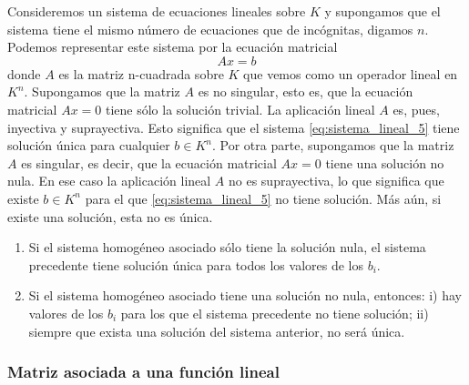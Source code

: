 Consideremos un sistema de ecuaciones lineales sobre \(K\) y supongamos que el sistema tiene el mismo número de ecuaciones que de incógnitas, digamos \(n\). Podemos representar este sistema por la ecuación matricial
\begin{equation}
  Ax = b
  \label{eq:sistema_lineal_5}  
\end{equation}
donde \(A\) es la matriz n-cuadrada sobre \(K\) que vemos como un operador lineal en \(K^n\). Supongamos que la matriz \(A\) es no singular, esto es, que la ecuación matricial \(Ax = 0\) tiene sólo la solución trivial. La aplicación lineal \(A\) es, pues, inyectiva y suprayectiva. Esto significa que el sistema \ref{eq:sistema_lineal_5} tiene solución única para cualquier \(b \in K^n\). Por otra parte, supongamos que la matriz \(A\) es singular, es decir, que la ecuación matricial \(Ax = 0\) tiene una solución no nula. En ese caso la aplicación lineal \(A\) no es suprayectiva, lo que significa que existe \(b \in K^n\) para el que \ref{eq:sistema_lineal_5} no tiene solución. Más aún, si existe una solución, esta no es única.

\begin{enumerate}[label=\alph*.]
  \item Si el sistema homogéneo asociado sólo tiene la solución nula, el sistema precedente tiene solución única para todos los valores de los \(b_i\).
  \item Si el sistema homogéneo asociado tiene una solución no nula, entonces: i) hay valores de los \(b_i\) para los que el sistema precedente no tiene solución; ii) siempre que exista una solución del sistema anterior, no será única.
\end{enumerate}

\subsubsection{Matriz asociada a una función lineal}

